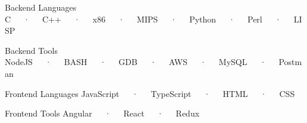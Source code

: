 
\begin{cvskills}
    
  \cvskill
    {Backend Languages}
    {C~~~·~~~C++~~~·~~~x86~~~·~~~MIPS~~~·~~~Python~~~·~~~Perl~~~·~~~LISP}
   
  \cvskill
    {Backend Tools}
    {NodeJS~~~·~~~BASH~~~·~~~GDB~~~·~~~AWS~~~·~~~MySQL~~~·~~~Postman}
    
   \cvskill
    {Frontend Languages}
    {JavaScript~~~·~~~TypeScript~~~·~~~HTML~~~·~~~CSS}
    
  \cvskill
    {Frontend Tools}
    {Angular~~~·~~~React~~~·~~~Redux}
\end{cvskills}
